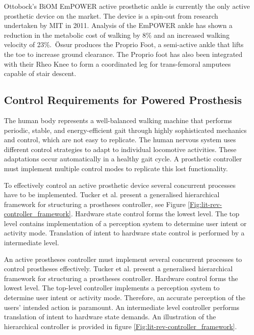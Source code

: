 Ottobock's BiOM EmPOWER active prosthetic ankle is currently the only active prosthetic device on the market.\cite{Nayak2020} The device is a spin-out from research undertaken by MIT in 2011.\cite{biom2018} Analysis of the EmPOWER ankle has shown a reduction in the metabolic cost of walking by 8\% and an increased walking velocity of 23\%\cite{Herr2012}.\ {\"O}ssur produces the Proprio Foot, a semi-active ankle that lifts the toe to increase ground clearance. The Proprio foot has also been integrated with their Rheo Knee to form a coordinated leg for trans-femoral amputees capable of stair descent.\cite{Ossur}

\subsection{Control Requirements for Powered Prosthesis} %
The human body represents a well-balanced walking machine that performs periodic, stable, and energy-efficient gait through highly sophisticated mechanics and control, which are not easy to replicate\cite{Mummolo2013}. The human nervous system uses different control strategies to adapt to individual locomotive activities\cite{Lay2007, Simon2013}. These adaptations occur automatically in a healthy gait cycle. A prosthetic controller must implement multiple control modes to replicate this lost functionality.

To effectively control an active prosthetic device several concurrent processes have to be implemented. Tucker et al. present a generalised hierarchical framework for structuring a prostheses controller, see Figure \ref{Fig:lit-rev-controller_framework}. Hardware state control forms the lowest level. The top level contains implementation of a perception system to determine user intent or activity mode. Translation of intent to hardware state control is performed by a intermediate level.\cite{Tucker2015}

An active prostheses controller must implement several concurrent processes to control prostheses effectively. Tucker et al. present a generalised hierarchical framework for structuring a prostheses controller. Hardware control forms the lowest level. The top-level controller implements a perception system to determine user intent or activity mode. Therefore, an accurate perception of the users' intended action is paramount\cite{Asif2021, Hernandez2021}. An intermediate level controller performs translation of intent to hardware state demands. An illustration of the hierarchical controller is provided in figure \ref{Fig:lit-rev-controller_framework}.\cite{Tucker2015}

